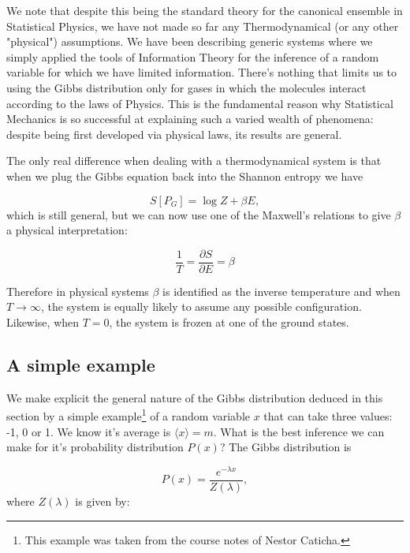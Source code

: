 We note that despite this being the standard theory for the canonical ensemble in Statistical Physics, we have not made so far any Thermodynamical (or any other "physical") assumptions. We have been describing generic systems where we simply applied the tools of Information Theory for the inference of a random variable for which we have limited information. There's nothing that limits us to using the Gibbs distribution only for gases in which the molecules interact according to the laws of Physics. This is the fundamental reason why Statistical Mechanics is so successful at explaining such a varied wealth of phenomena: despite being first developed via physical laws, its results are general.

The only real difference when dealing with a thermodynamical system is that when we plug the Gibbs equation back into the Shannon entropy we have

\begin{equation}
    S[P_G] = \log Z + \beta E,
\end{equation}
which is still general, but we can now use one of the Maxwell's relations to give $\beta$ a physical interpretation:

\begin{equation}
   \frac{1}{T} = \frac{\partial S}{\partial E} = \beta
\end{equation}

Therefore in physical systems $\beta$ is identified as the inverse temperature and when $T \to \infty$, the system is equally likely to assume any possible configuration. Likewise, when $T = 0$, the system is frozen at one of the ground states. 


\subsection{A simple example}

We make explicit the general nature of the Gibbs distribution deduced in this section by a simple example\footnote{This example was taken from the course notes of Nestor Caticha.} of a random variable $x$ that can take three values: -1, 0 or 1. We know it's average is $\langle x \rangle = m$. What is the best inference we can make for it's probability distribution $P(x)$? The Gibbs distribution is

\begin{equation}
   P(x) = \frac{e^{-\lambda x}}{Z(\lambda)},
\end{equation}
where $Z(\lambda)$ is given by:


